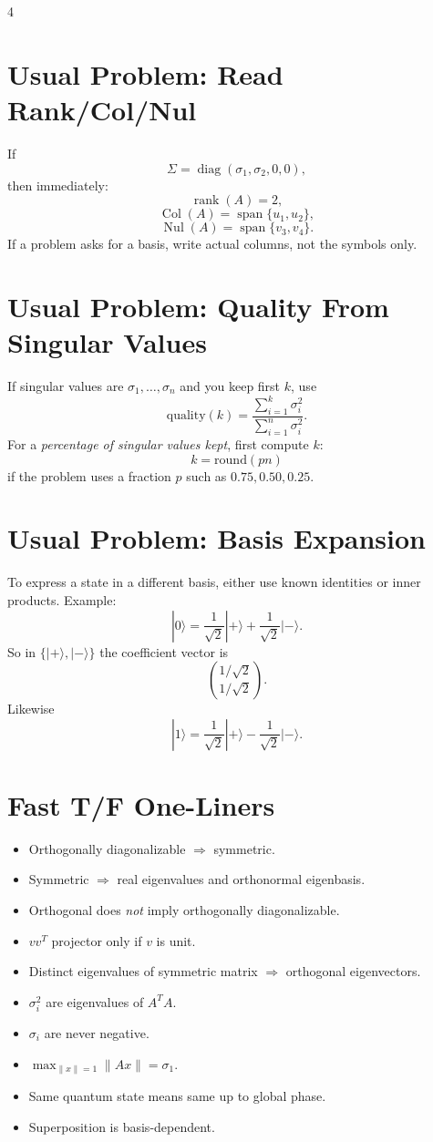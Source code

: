 \documentclass[letterpaper]{article}
\newcommand{\Span}{\operatorname{span}}
\newcommand{\Col}{\operatorname{Col}}
\newcommand{\Nul}{\operatorname{Nul}}
\newcommand{\Rank}{\operatorname{rank}}
\newcommand{\diag}{\operatorname{diag}}
\newcommand{\ket}[1]{|#1\rangle}
\begin{document}
\begin{multicols*}{4}
\section{Usual Problem: Read Rank/Col/Nul}
If
\[
\Sigma=\diag(\sigma_1,\sigma_2,0,0),
\]
then immediately:
\[
\Rank(A)=2,
\]
\[
\Col(A)=\Span\{u_1,u_2\},
\]
\[
\Nul(A)=\Span\{v_3,v_4\}.
\]
If a problem asks for a basis, write actual columns, not the symbols only.

\section{Usual Problem: Quality From Singular Values}
If singular values are $\sigma_1,\dots,\sigma_n$ and you keep first $k$, use
\[
\text{quality}(k)=\frac{\sum_{i=1}^k\sigma_i^2}{\sum_{i=1}^n\sigma_i^2}.
\]
For a \emph{percentage of singular values kept}, first compute $k$:
\[
k=\text{round}(pn)
\]
if the problem uses a fraction $p$ such as $0.75,0.50,0.25$.

\section{Usual Problem: Basis Expansion}
To express a state in a different basis, either use known identities or inner products.
Example:
\[
\ket0=\frac{1}{\sqrt2}\ket+ + \frac{1}{\sqrt2}\ket-.
\]
So in $\{\ket+,\ket-\}$ the coefficient vector is
\[
\binom{1/\sqrt2}{1/\sqrt2}.
\]
Likewise
\[
\ket1=\frac{1}{\sqrt2}\ket+ - \frac{1}{\sqrt2}\ket-.
\]

\section{Fast T/F One-Liners}
\begin{itemize}
\item Orthogonally diagonalizable $\Rightarrow$ symmetric.
\item Symmetric $\Rightarrow$ real eigenvalues and orthonormal eigenbasis.
\item Orthogonal does \emph{not} imply orthogonally diagonalizable.
\item $vv^T$ projector only if $v$ is unit.
\item Distinct eigenvalues of symmetric matrix $\Rightarrow$ orthogonal eigenvectors.
\item $\sigma_i^2$ are eigenvalues of $A^TA$.
\item $\sigma_i$ are never negative.
\item $\max_{\|x\|=1}\|Ax\|=\sigma_1$.
\item Same quantum state means same up to global phase.
\item Superposition is basis-dependent.
\end{itemize}

\end{multicols*}
\end{document}
